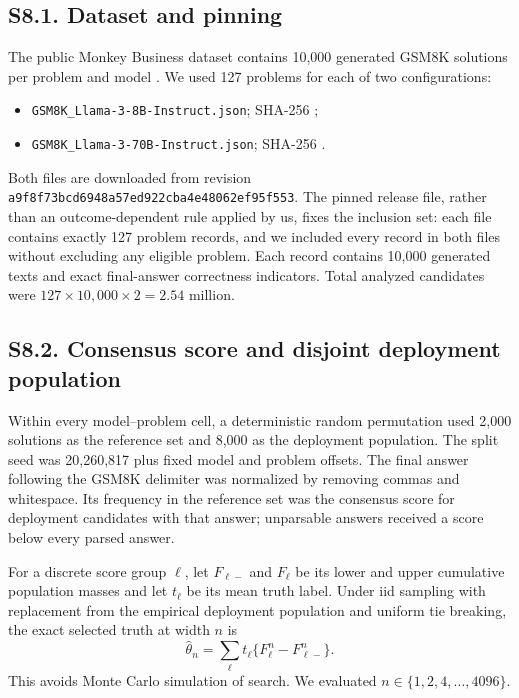 \subsection*{S8.1. Dataset and pinning}

The public Monkey Business dataset contains 10,000 generated GSM8K solutions per problem and model \citep{brown2024}. We used 127 problems for each of two configurations:
\begin{itemize}
\item \texttt{GSM8K\_Llama-3-8B-Instruct.json}; SHA-256 \texttt{};
\item \texttt{GSM8K\_Llama-3-70B-Instruct.json}; SHA-256 \texttt{}.
\end{itemize}
Both files are downloaded from revision \texttt{a9f8f73bcd6948a57ed922cba4e48062ef95f553}. The pinned release file, rather than an outcome-dependent rule applied by us, fixes the inclusion set: each file contains exactly 127 problem records, and we included every record in both files without excluding any eligible problem. Each record contains 10,000 generated texts and exact final-answer correctness indicators. Total analyzed candidates were $127\times10{,}000\times2=2.54$ million.

\subsection*{S8.2. Consensus score and disjoint deployment population}

Within every model--problem cell, a deterministic random permutation used 2,000 solutions as the reference set and 8,000 as the deployment population. The split seed was 20,260,817 plus fixed model and problem offsets. The final answer following the GSM8K delimiter was normalized by removing commas and whitespace. Its frequency in the reference set was the consensus score for deployment candidates with that answer; unparsable answers received a score below every parsed answer.

For a discrete score group $\ell$, let $F_{\ell-}$ and $F_\ell$ be its lower and upper cumulative population masses and let $t_\ell$ be its mean truth label. Under iid sampling with replacement from the empirical deployment population and uniform tie breaking, the exact selected truth at width $n$ is
\begin{equation}
\widehat\theta_n
=\sum_\ell t_\ell\{F_\ell^n-F_{\ell-}^n\}.
\label{si:eq:empirical-winner}
\end{equation}
This avoids Monte Carlo simulation of search. We evaluated $n\in\{1,2,4,\ldots,4096\}$.


